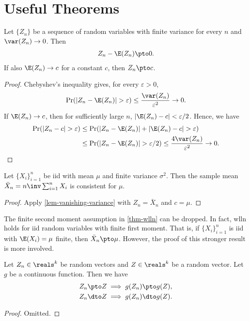 \documentclass[a4paper,12pt]{article}
\begin{document}
\section{Useful Theorems}

\begin{lemma}\label{lem-vanishing-variance}
	Let $\{Z_n\}$ be a sequence of random variables with finite variance
	for every $n$ and $\var(Z_n)\to0$.
	Then
	\begin{align}
		Z_n-\E(Z_n)\pto0.
	\end{align}
	If also $\E(Z_n)\to c$ for a constant $c$, then $Z_n\pto c$.
\end{lemma}
\begin{proof}
	Chebyshev's inequality gives, for every $\varepsilon>0$,
	\begin{align*}
		\Pr(|Z_n-\E(Z_n)|>\varepsilon)
		\le\frac{\var(Z_n)}{\varepsilon^2}\to0.
	\end{align*}
	If $\E(Z_n)\to c$, then for sufficiently large $n$,
	$|\E(Z_n)-c|<\varepsilon/2$.
	Hence, we have
	\begin{align*}
		\Pr(|Z_n-c|>\varepsilon)
		&\le \Pr(|Z_n-\E(Z_n)|+|\E(Z_n)-c|>\varepsilon) \\
		&\le \Pr(|Z_n-\E(Z_n)|>\varepsilon/2)
		\le \frac{4\var(Z_n)}{\varepsilon^2}\to0.
		\qedhere
	\end{align*}
\end{proof}

\begin{theorem}\label{thm-wlln}
	Let $\{X_i\}_{i=1}^{n}$ be \gls{iid} with mean $\mu$ and finite variance $\sigma^2$.
	Then the sample mean $\bar X_n=n\inv\sum_{i=1}^nX_i$ is consistent for $\mu$.
\end{theorem}
\begin{proof}
	Apply \autoref{lem-vanishing-variance} with $Z_n=\bar X_n$ and $c=\mu$.
\end{proof}

\begin{remark}
	The finite second moment assumption in \autoref{thm-wlln} can be dropped.
	In fact, \gls{wlln} holds for \gls{iid} random variables with finite first moment.
	That is, if $\{X_i\}_{i=1}^{n}$ is \gls{iid} with $\E(X_i)=\mu$ finite, then $\bar X_n\pto\mu$.
	However, the proof of this stronger result is more involved.
\end{remark}

\begin{theorem}\label{thm-continuous-mapping}
	Let $Z_n\in\reals^k$ be random vectors and $Z\in\reals^k$ be a random vector.
	Let $g$ be a continuous function.
	Then we have
	\begin{align}
		Z_n\pto Z  &\implies g(Z_n)\pto g(Z), \\
		Z_n\dto Z  &\implies g(Z_n)\dto g(Z).
	\end{align}
\end{theorem}
\begin{proof}
	Omitted.
\end{proof}
\end{document}
